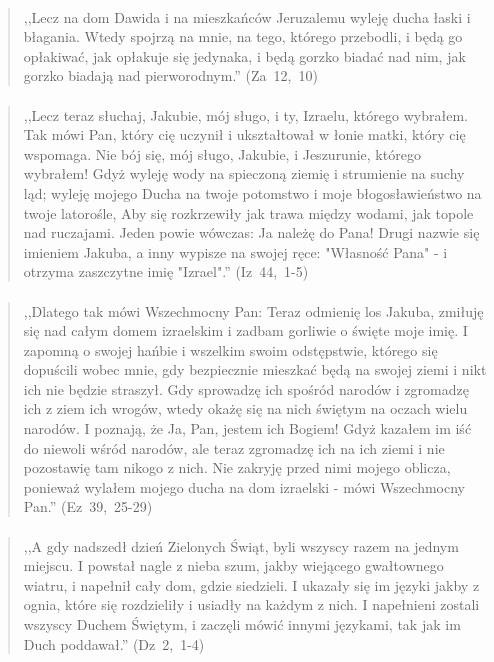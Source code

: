 \documentclass[10pt,a4paper,oneside]{article}
\begin{document}
\paragraph{}
\begin{quote}
,,Lecz na dom Dawida i na mieszkańców Jeruzalemu wyleję ducha łaski i błagania. Wtedy spojrzą na mnie, na tego, którego przebodli, i będą go opłakiwać, jak opłakuje się jedynaka, i będą gorzko biadać nad nim, jak gorzko biadają nad pierworodnym.'' \mbox{(Za 12, 10)}
\end{quote}
\paragraph{}
\begin{quote}
,,Lecz teraz słuchaj, Jakubie, mój sługo, i ty, Izraelu, którego wybrałem. Tak mówi Pan, który cię uczynił i ukształtował w łonie matki, który cię wspomaga. Nie bój się, mój sługo, Jakubie, i Jeszurunie, którego wybrałem! Gdyż wyleję wody na spieczoną ziemię i strumienie na suchy ląd; wyleję mojego Ducha na twoje potomstwo i moje błogosławieństwo na twoje latorośle, Aby się rozkrzewiły jak trawa między wodami, jak topole nad ruczajami. Jeden powie wówczas: Ja należę do Pana! Drugi nazwie się imieniem Jakuba, a inny wypisze na swojej ręce: "Własność Pana" - i otrzyma zaszczytne imię "Izrael".'' \mbox{(Iz 44, 1-5)}
\end{quote}
\paragraph{}
\begin{quote}
,,Dlatego tak mówi Wszechmocny Pan: Teraz odmienię los Jakuba, zmiłuję się nad całym domem izraelskim i zadbam gorliwie o święte moje imię. I zapomną o swojej hańbie i wszelkim swoim odstępstwie, którego się dopuścili wobec mnie, gdy bezpiecznie mieszkać będą na swojej ziemi i nikt ich nie będzie straszył. Gdy sprowadzę ich spośród narodów i zgromadzę ich z ziem ich wrogów, wtedy okażę się na nich świętym na oczach wielu narodów. I poznają, że Ja, Pan, jestem ich Bogiem! Gdyż kazałem im iść do niewoli wśród narodów, ale teraz zgromadzę ich na ich ziemi i nie pozostawię tam nikogo z nich. Nie zakryję przed nimi mojego oblicza, ponieważ wylałem mojego ducha na dom izraelski - mówi Wszechmocny Pan.'' \mbox{(Ez 39, 25-29)}
\end{quote}
\paragraph{}
\begin{quote}
,,A gdy nadszedł dzień Zielonych Świąt, byli wszyscy razem na jednym miejscu. I powstał nagle z nieba szum, jakby wiejącego gwałtownego wiatru, i napełnił cały dom, gdzie siedzieli. I ukazały się im języki jakby z ognia, które się rozdzieliły i usiadły na każdym z nich. I napełnieni zostali wszyscy Duchem Świętym, i zaczęli mówić innymi językami, tak jak im Duch poddawał.'' \mbox{(Dz 2, 1-4)}
\end{quote}
\end{document}
